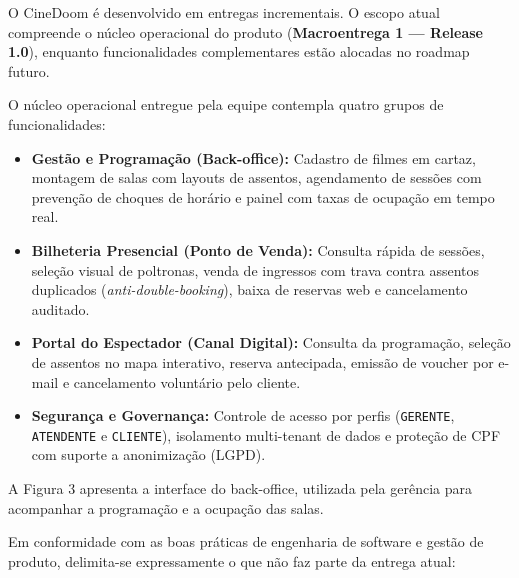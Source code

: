 
O CineDoom é desenvolvido em entregas incrementais. O escopo atual compreende o núcleo operacional do produto (\textbf{Macroentrega 1 — Release 1.0}), enquanto funcionalidades complementares estão alocadas no roadmap futuro.


O núcleo operacional entregue pela equipe contempla quatro grupos de funcionalidades:

\begin{itemize}
\tightlist
\item \textbf{Gestão e Programação (Back-office):} Cadastro de filmes em cartaz, montagem de salas com layouts de assentos, agendamento de sessões com prevenção de choques de horário e painel com taxas de ocupação em tempo real.
\item \textbf{Bilheteria Presencial (Ponto de Venda):} Consulta rápida de sessões, seleção visual de poltronas, venda de ingressos com trava contra assentos duplicados (\emph{anti-double-booking}), baixa de reservas web e cancelamento auditado.
\item \textbf{Portal do Espectador (Canal Digital):} Consulta da programação, seleção de assentos no mapa interativo, reserva antecipada, emissão de voucher por e-mail e cancelamento voluntário pelo cliente.
\item \textbf{Segurança e Governança:} Controle de acesso por perfis (\texttt{GERENTE}, \texttt{ATENDENTE} e \texttt{CLIENTE}), isolamento multi-tenant de dados e proteção de CPF com suporte a anonimização (LGPD).
\end{itemize}

A Figura 3 apresenta a interface do back-office, utilizada pela gerência para acompanhar a programação e a ocupação das salas.



Em conformidade com as boas práticas de engenharia de software e gestão de produto, delimita-se expressamente o que não faz parte da entrega atual:

